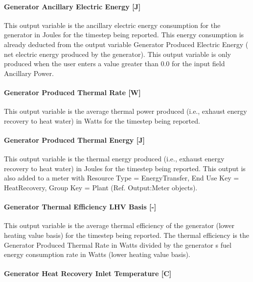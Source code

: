 \paragraph{Generator Ancillary Electric Energy {[}J{]}}\label{generator-ancillary-electric-energy-j}

This output variable is the ancillary electric energy consumption for the generator in Joules for the timestep being reported. This energy consumption is already deducted from the output variable Generator Produced Electric Energy ( net electric energy produced by the generator). This output variable is only produced when the user enters a value greater than 0.0 for the input field Ancillary Power.

\paragraph{Generator Produced Thermal Rate {[}W{]}}\label{generator-produced-thermal-rate-w-1}

This output variable is the average thermal power produced (i.e., exhaust energy recovery to heat water) in Watts for the timestep being reported.

\paragraph{Generator Produced Thermal Energy {[}J{]}}\label{generator-produced-thermal-energy-j-1}

This output variable is the thermal energy produced (i.e., exhaust energy recovery to heat water) in Joules for the timestep being reported. This output is also added to a meter with Resource Type = EnergyTransfer, End Use Key = HeatRecovery, Group Key = Plant (Ref. Output:Meter objects).

\paragraph{Generator Thermal Efficiency LHV Basis {[}-{]}}\label{generator-thermal-efficiency-lhv-basis--}

This output variable is the average thermal efficiency of the generator (lower heating value basis) for the timestep being reported. The thermal efficiency is the Generator Produced Thermal Rate in Watts divided by the generator s fuel energy consumption rate in Watts (lower heating value basis).

\paragraph{Generator Heat Recovery Inlet Temperature {[}C{]}}\label{generator-heat-recovery-inlet-temperature-c-1}

